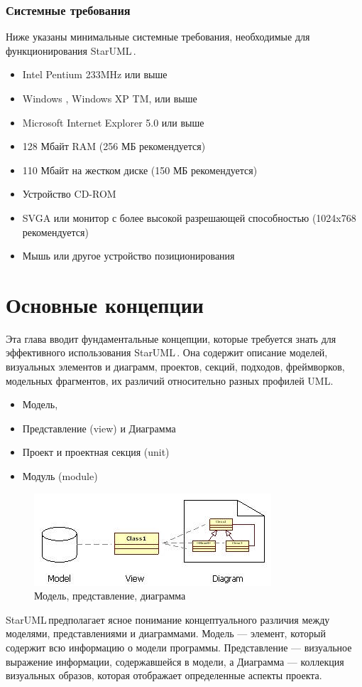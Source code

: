\documentclass[a4paper,12pt]{extreport}
\newcommand{\staruml}{StarUML\,\tm}
\begin{document}
\subsection*{Системные требования}
Ниже указаны минимальные системные требования, необходимые для функционирования
\staruml.
\begin{itemize}
	\item Intel \reg Pentium \reg 233MHz или выше
	\item Windows , Windows XP TM, или выше
	\item Microsoft \reg Internet Explorer 5.0 или выше
	\item 128 Мбайт RAM (256 МБ рекомендуется)
	\item 110 Мбайт на жестком диске (150 МБ рекомендуется)
	\item Устройство CD-ROM
	\item SVGA или монитор с более высокой разрешающей способностью (1024x768 рекомендуется)
	\item Мышь или другое устройство позиционирования
\end{itemize}
\chapter{Основные концепции}
Эта глава вводит фундаментальные концепции, которые требуется знать для эффективного
использования \staruml. Она содержит описание моделей, визуальных элементов и диаграмм,
проектов, секций, подходов, фреймворков, модельных фрагментов, их различий относительно
разных профилей UML.
\begin{itemize}
	\item Модель,
	\item Представление (view) и Диаграмма
	\item Проект и проектная секция (unit)
	\item Модуль (module)
\end{itemize}

\begin{figure}[h!]
	\centering
	\includegraphics[width=0.7\linewidth]{images/modelviewdiagram}
	\caption{Модель, представление, диаграмма}
	\label{fig:modelviewdiagram}
\end{figure}
\staruml предполагает ясное понимание концептуального различия между моделями,
представлениями и диаграммами. Модель --- элемент, который содержит всю информацию о модели
программы. Представление --- визуальное выражение информации, содержавшейся в модели, а
Диаграмма --- коллекция визуальных образов, которая отображает определенные аспекты проекта.
\end{document}
